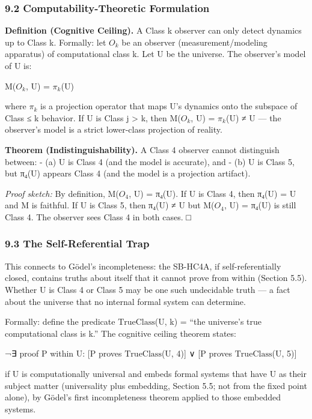 \documentclass[
]{article}
\begin{document}
\hypertarget{computability-theoretic-formulation}{%
\subsubsection{9.2 Computability-Theoretic
Formulation}\label{computability-theoretic-formulation}}

\textbf{Definition (Cognitive Ceiling).} A Class k observer can only
detect dynamics up to Class k. Formally: let \(O_{k}\) be an observer
(measurement/modeling apparatus) of computational class k. Let U be the
universe. The observer's model of U is:

M(\(O_{k}\), U) = \(\pi_{k}\)(U)

where \(\pi_{k}\) is a projection operator that maps U's dynamics onto
the subspace of Class ≤ k behavior. If U is Class j \textgreater{} k,
then M(\(O_{k}\), U) = \(\pi_{k}\)(U) ≠ U --- the observer's model is a
strict lower-class projection of reality.

\textbf{Theorem (Indistinguishability).} A Class 4 observer cannot
distinguish between: - (a) U is Class 4 (and the model is accurate), and
- (b) U is Class 5, but π₄(U) appears Class 4 (and the model is a
projection artifact).

\emph{Proof sketch:} By definition, M(\(O_{4}\), U) = π₄(U). If U is
Class 4, then π₄(U) = U and M is faithful. If U is Class 5, then π₄(U) ≠
U but M(\(O_{4}\), U) = π₄(U) is still Class 4. The observer sees Class
4 in both cases. □

\hypertarget{the-self-referential-trap}{%
\subsubsection{9.3 The Self-Referential
Trap}\label{the-self-referential-trap}}

This connects to Gödel's incompleteness: the SB-HC4A, if
self-referentially closed, contains truths about itself that it cannot
prove from within (Section 5.5). Whether U is Class 4 or Class 5 may be
one such undecidable truth --- a fact about the universe that no
internal formal system can determine.

Formally: define the predicate \(\mathrm{TrueClass}\)(U, k) = ``the
universe's true computational class is k.'' The cognitive ceiling
theorem states:

¬∃ proof P within U: {[}P proves \(\mathrm{TrueClass}\)(U, 4){]} ∨ {[}P
proves \(\mathrm{TrueClass}\)(U, 5){]}

if U is computationally universal and embeds formal systems that have U
as their subject matter (universality plus embedding, Section 5.5; not
from the fixed point alone), by Gödel's first incompleteness theorem
applied to those embedded systems.
\end{document}
